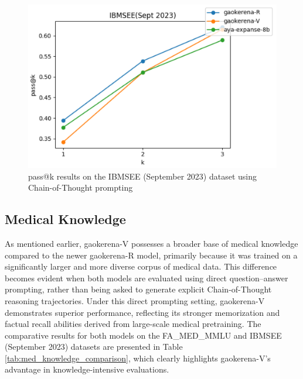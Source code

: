 \documentclass[conference]{IEEEtran}
\begin{document}
\begin{figure}[h]
    \centering
    \includegraphics[width=0.8\linewidth]{fig4.png}
    \caption{pass@k results on the IBMSEE (September 2023) dataset using Chain-of-Thought prompting}
    \label{fig4}
\end{figure}

           \subsection{Medical Knowledge}
As mentioned earlier, gaokerena-V possesses a broader base of medical knowledge compared to the newer gaokerena-R model, primarily because it was trained on a significantly larger and more diverse corpus of medical data. This difference becomes evident when both models are evaluated using direct question–answer prompting, rather than being asked to generate explicit Chain-of-Thought reasoning trajectories. Under this direct prompting setting, gaokerena-V demonstrates superior performance, reflecting its stronger memorization and factual recall abilities derived from large-scale medical pretraining. The comparative results for both models on the FA\_MED\_MMLU and IBMSEE (September 2023) datasets are presented in Table
\ref{tab:med_knowledge_comparison}, which clearly highlights gaokerena-V’s advantage in knowledge-intensive evaluations.
\end{document}

